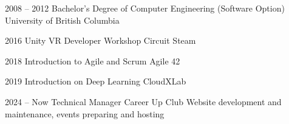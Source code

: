 \documentclass[9pt]{developercv} %
\begin{document}


\begin{entrylist}
	\entry
		{2008 -- 2012}
		{Bachelor's Degree of Computer Engineering (Software Option)}
		{University of British Columbia}
		{}
\end{entrylist}
\begin{entrylist}
	\entry
		{2016}
		{Unity VR Developer Workshop}
		{Circuit Steam}
		{}
\end{entrylist}
\begin{entrylist}
	\entry
		{2018}
		{Introduction to Agile and Scrum}
		{Agile 42}
		{}
\end{entrylist}
\begin{entrylist}
	\entry
		{2019}
		{Introduction on Deep Learning}
		{CloudXLab}
		{}
\end{entrylist}


\begin{entrylist}
	\entry
		{2024 -- Now}
		{Technical Manager}
		{Career Up Club}
		{Website development and maintenance, events preparing and hosting}
\end{entrylist}
\end{document}
